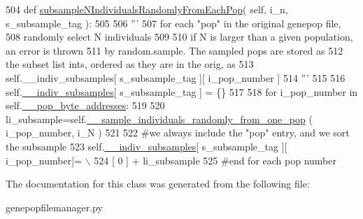 \begin{DoxyCode}
504     \textcolor{keyword}{def }\hyperlink{classnegui_1_1genepopfilemanager_1_1GenepopFileManager_affaeb9457d84736dc1f289d600808f56}{subsampleNIndividualsRandomlyFromEachPop}( self, i\_n, 
      s\_subsample\_tag ):
505 
506         \textcolor{stringliteral}{'''}
507 \textcolor{stringliteral}{        for each "pop" in the original genepop file,}
508 \textcolor{stringliteral}{        randomly select N individuals}
509 \textcolor{stringliteral}{        }
510 \textcolor{stringliteral}{        if N is larger than a given population, an error is thrown}
511 \textcolor{stringliteral}{        by random.sample.  The sampled pops are stored as }
512 \textcolor{stringliteral}{        the subset list ints, ordered as they are in the orig, as       }
513 \textcolor{stringliteral}{        self.\_\_indiv\_subsamples[ s\_subsample\_tag ][ i\_pop\_number ]}
514 \textcolor{stringliteral}{        '''}
515 
516         self.\hyperlink{classnegui_1_1genepopfilemanager_1_1GenepopFileManager_a1e8379bcee4902ca9314ff53fcb71644}{\_\_indiv\_subsamples}[ s\_subsample\_tag ] = \{\}
517 
518         \textcolor{keywordflow}{for} i\_pop\_number \textcolor{keywordflow}{in} self.\hyperlink{classnegui_1_1genepopfilemanager_1_1GenepopFileManager_ae24c2bdd19136a345bdb42fd49c5d91f}{\_\_pop\_byte\_addresses}:
519             
520             li\_subsample=self.\hyperlink{classnegui_1_1genepopfilemanager_1_1GenepopFileManager_ae5a84fa307ba7bbefebe80ac7416c4cd}{\_\_sample\_individuals\_randomly\_from\_one\_pop}
      ( i\_pop\_number, i\_N )
521 
522             \textcolor{comment}{#we always include the "pop" entry, and we sort the subsample}
523             self.\hyperlink{classnegui_1_1genepopfilemanager_1_1GenepopFileManager_a1e8379bcee4902ca9314ff53fcb71644}{\_\_indiv\_subsamples}[ s\_subsample\_tag ][ i\_pop\_number]= \(\backslash\)
524                      [ 0 ] +  li\_subsample
525         \textcolor{comment}{#end for each pop number}
\end{DoxyCode}


The documentation for this class was generated from the following file\+:\begin{DoxyCompactItemize}
\item 
genepopfilemanager.\+py\end{DoxyCompactItemize}
